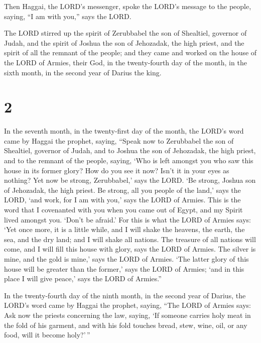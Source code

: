  Then Haggai, the LORD's messenger, spoke the LORD's
message to the people, saying, ``I am with you,'' says the LORD.

 The LORD stirred up the spirit of Zerubbabel the son of
Shealtiel, governor of Judah, and the spirit of Joshua the son of
Jehozadak, the high priest, and the spirit of all the remnant of the
people; and they came and worked on the house of the LORD of Armies,
their God,  in the twenty-fourth day of the month, in the
sixth month, in the second year of Darius the king.

\hypertarget{section-1}{%
\section{2}\label{section-1}}

 In the seventh month, in the twenty-first day of the month,
the LORD's word came by Haggai the prophet, saying,  ``Speak
now to Zerubbabel the son of Shealtiel, governor of Judah, and to Joshua
the son of Jehozadak, the high priest, and to the remnant of the people,
saying,  `Who is left amongst you who saw this house in its
former glory? How do you see it now? Isn't it in your eyes as nothing?
 Yet now be strong, Zerubbabel,' says the LORD. `Be strong,
Joshua son of Jehozadak, the high priest. Be strong, all you people of
the land,' says the LORD, `and work, for I am with you,' says the LORD
of Armies.  This is the word that I covenanted with you when
you came out of Egypt, and my Spirit lived amongst you. `Don't be
afraid.'  For this is what the LORD of Armies says: `Yet
once more, it is a little while, and I will shake the heavens, the
earth, the sea, and the dry land;  and I will shake all
nations. The treasure of all nations will come, and I will fill this
house with glory, says the LORD of Armies.  The silver is
mine, and the gold is mine,' says the LORD of Armies.  `The
latter glory of this house will be greater than the former,' says the
LORD of Armies; `and in this place I will give peace,' says the LORD of
Armies.''

 In the twenty-fourth day of the ninth month, in the second
year of Darius, the LORD's word came by Haggai the prophet, saying,
 ``The LORD of Armies says: Ask now the priests concerning
the law, saying,  `If someone carries holy meat in the fold
of his garment, and with his fold touches bread, stew, wine, oil, or any
food, will it become holy?'\,''

